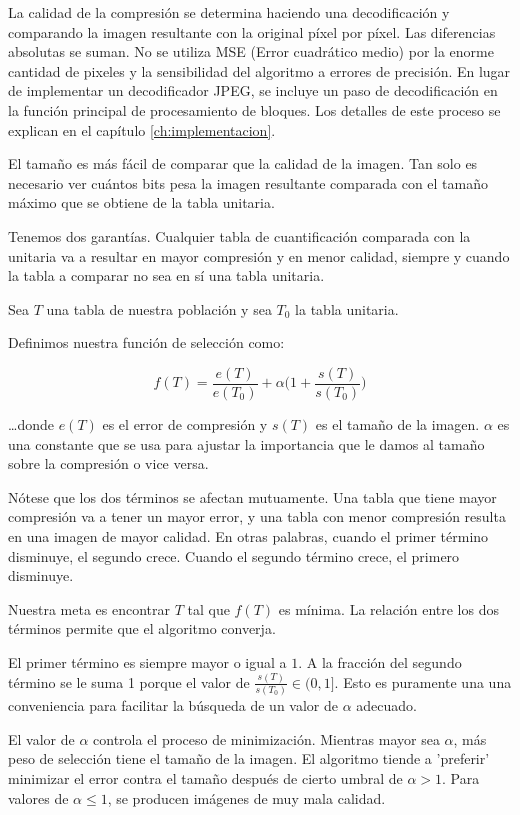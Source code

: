 La calidad de la compresión se determina haciendo una decodificación y
comparando la imagen resultante con la original píxel por píxel. Las
diferencias absolutas se suman. No se utiliza MSE (Error cuadrático medio) por
la enorme cantidad de pixeles y la sensibilidad del algoritmo a errores de
precisión. En lugar de implementar un decodificador JPEG, se incluye un paso de
decodificación en la función principal de procesamiento de bloques. Los
detalles de este proceso se explican en el capítulo \ref{ch:implementacion}.

El tamaño es más fácil de comparar que la calidad de la imagen. Tan solo es
necesario ver cuántos bits pesa la imagen resultante comparada con el tamaño
máximo que se obtiene de la tabla unitaria.

Tenemos dos garantías. Cualquier tabla de cuantificación comparada con la
unitaria va a resultar en mayor compresión y en menor calidad, siempre y cuando
la tabla a comparar no sea en sí una tabla unitaria.

Sea $T$ una tabla de nuestra población y sea $T_0$ la tabla unitaria.

Definimos nuestra función de selección como:

\begin{equation}
f(T) = \frac{e(T)}{e(T_0)} + \alpha \Big(1 + \frac{s(T)}{s(T_0)}\Big)
\end{equation}\label{eq:fitness}

\dots donde $e(T)$ es el error de compresión y $s(T)$ es el tamaño de la
imagen. $\alpha$ es una constante que se usa para ajustar la importancia que le
damos al tamaño sobre la compresión o vice versa.

Nótese que los dos términos se afectan mutuamente. Una tabla que tiene mayor
compresión va a tener un mayor error, y una tabla con menor compresión resulta
en una imagen de mayor calidad. En otras palabras, cuando el primer término
disminuye, el segundo crece.  Cuando el segundo término crece, el primero
disminuye.

Nuestra meta es encontrar $T$ tal que $f(T)$ es mínima. La relación entre los
dos términos permite que el algoritmo converja.

El primer término es siempre mayor o igual a $1$. A la fracción del segundo
término se le suma 1 porque el valor de $\frac{s(T)}{s(T_0)} \in (0, 1]$. Esto
es puramente una una conveniencia para facilitar la búsqueda de un valor de
$\alpha$ adecuado.

El valor de $\alpha$ controla el proceso de minimización. Mientras mayor sea
$\alpha$, más peso de selección tiene el tamaño de la imagen. El algoritmo tiende
a 'preferir' minimizar el error contra el tamaño después de cierto umbral de
$\alpha > 1$. Para valores de $\alpha \leq 1$, se producen imágenes de muy mala calidad.

